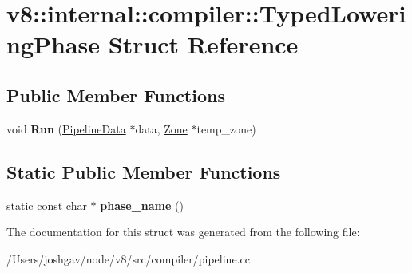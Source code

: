 \hypertarget{structv8_1_1internal_1_1compiler_1_1_typed_lowering_phase}{}\section{v8\+:\+:internal\+:\+:compiler\+:\+:Typed\+Lowering\+Phase Struct Reference}
\label{structv8_1_1internal_1_1compiler_1_1_typed_lowering_phase}
\subsection*{Public Member Functions}
\begin{DoxyCompactItemize}
\item 
void {\bfseries Run} (\hyperlink{classv8_1_1internal_1_1compiler_1_1_pipeline_data}{Pipeline\+Data} $\ast$data, \hyperlink{classv8_1_1internal_1_1_zone}{Zone} $\ast$temp\+\_\+zone)\hypertarget{structv8_1_1internal_1_1compiler_1_1_typed_lowering_phase_a96b4962cb54b4166764164b8308c9d3f}{}\label{structv8_1_1internal_1_1compiler_1_1_typed_lowering_phase_a96b4962cb54b4166764164b8308c9d3f}

\end{DoxyCompactItemize}
\subsection*{Static Public Member Functions}
\begin{DoxyCompactItemize}
\item 
static const char $\ast$ {\bfseries phase\+\_\+name} ()\hypertarget{structv8_1_1internal_1_1compiler_1_1_typed_lowering_phase_ab952c3c9cbfcf376efe31dec108d313c}{}\label{structv8_1_1internal_1_1compiler_1_1_typed_lowering_phase_ab952c3c9cbfcf376efe31dec108d313c}

\end{DoxyCompactItemize}


The documentation for this struct was generated from the following file\+:\begin{DoxyCompactItemize}
\item 
/\+Users/joshgav/node/v8/src/compiler/pipeline.\+cc\end{DoxyCompactItemize}
